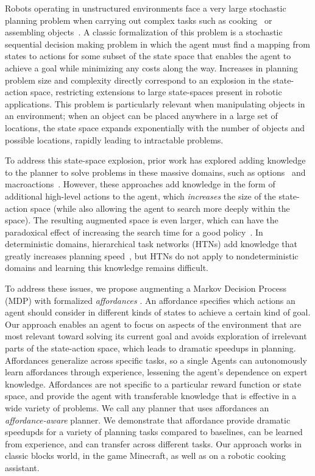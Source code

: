 \documentclass[conference]{IEEEtran}
\begin{document}
Robots operating in unstructured environments face a very large
stochastic planning problem when carrying out complex tasks such as
cooking~\citep{bollini12} or assembling objects~\citep{knepper13}.  A
classic formalization of this problem is a stochastic sequential
decision making problem in which the agent must find a mapping from
states to actions for some subset of the state space that enables the
agent to achieve a goal while minimizing any costs along the way.
Increases in planning problem size and complexity directly correspond
to an explosion in the state-action space, restricting extensions to
large state-spaces present in robotic applications.  This problem is
particularly relevant when manipulating objects in an environment;
when an object can be placed anywhere in a large set of locations, the
state space expands exponentially with the number of objects and
possible locations, rapidly leading to intractable problems.



To address this state-space explosion, prior work has explored adding
knowledge to the planner to solve problems in these massive domains,
such as options~\cite{sutton99} and
macroactions~\cite{Botea:2005kx,Newton:2005vn}. However, these
approaches add knowledge in the form of additional high-level actions
to the agent, which {\em increases} the size of the state-action space
(while also allowing the agent to search more deeply within the
space).  The resulting augmented space is even larger, which can have
the paradoxical effect of increasing the search time for a good
policy~\cite{Jong:2008zr}.  In deterministic domains, hierarchical
task networks (HTNs) add knowledge that greatly increases planning
speed~\citep{}, but HTNs do not apply to nondeterministic domains and
learning this knowledge remains difficult.


To address these issues, we propose augmenting a Markov Decision
Process (MDP) with formalized {\em affordances} \cite{gibson77}.  An
affordance specifies which actions an agent should consider in
different kinds of states to achieve a certain kind of goal.  Our
approach enables an agent to focus on aspects of the environment that
are most relevant toward solving its current goal and avoids
exploration of irrelevant parts of the state-action space, which leads
to dramatic speedups in planning.  Affordances generalize across
specific tasks, so a single Agents can autonomously learn affordances
through experience, lessening the agent's dependence on expert
knowledge. Affordances are not specific to a particular reward
function or state space, and provide the agent with transferable
knowledge that is effective in a wide variety of problems. We call any
planner that uses affordances an {\it affordance-aware} planner.  We
demonstrate that affordance provide dramatic speedupds for a variety
of planning tasks compared to baselines, can be learned from
experience, and can transfer across different tasks.  Our approach
works in classic blocks world, in the game Minecraft, as well as on a
robotic cooking assistant.
\end{document}
